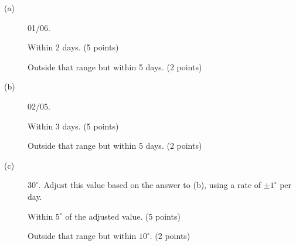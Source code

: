 \begin{description}
\item[(a)] 01/06.

  Within 2 days. \hfill(5 points)

  Outside that range but within 5 days. \hfill(2 points)

\item[(b)] 02/05.

  Within 3 days. \hfill(5 points)

  Outside that range but within 5 days. \hfill(2 points)

\item[(c)] $30^\circ$. Adjust this value based on the answer to (b), using
  a rate of $\pm 1^\circ$ per day.

  Within $5^\circ$ of the adjusted value. \hfill(5 points)

  Outside that range but within $10^\circ$. \hfill(2 points)
\end{description}
